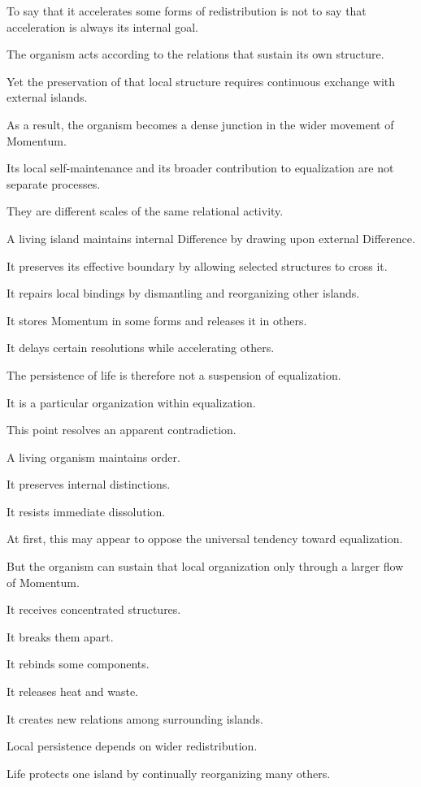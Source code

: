 To say that it accelerates some forms of redistribution is not to say that acceleration is always its internal goal.

The organism acts according to the relations that sustain its own structure.

Yet the preservation of that local structure requires continuous exchange with external islands.

As a result, the organism becomes a dense junction in the wider movement of Momentum.

Its local self-maintenance and its broader contribution to equalization are not separate processes.

They are different scales of the same relational activity.

A living island maintains internal Difference by drawing upon external Difference.

It preserves its effective boundary by allowing selected structures to cross it.

It repairs local bindings by dismantling and reorganizing other islands.

It stores Momentum in some forms and releases it in others.

It delays certain resolutions while accelerating others.

The persistence of life is therefore not a suspension of equalization.

It is a particular organization within equalization.

This point resolves an apparent contradiction.

A living organism maintains order.

It preserves internal distinctions.

It resists immediate dissolution.

At first, this may appear to oppose the universal tendency toward equalization.

But the organism can sustain that local organization only through a larger flow of Momentum.

It receives concentrated structures.

It breaks them apart.

It rebinds some components.

It releases heat and waste.

It creates new relations among surrounding islands.

Local persistence depends on wider redistribution.

Life protects one island by continually reorganizing many others.


